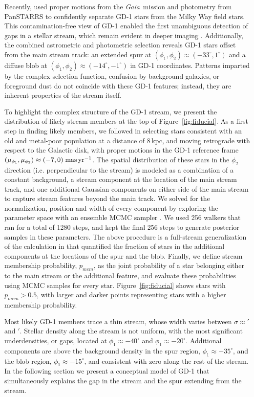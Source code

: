 \documentclass[twocolumn]{aastex62}
\newcommand{\gaia}{\textsl{Gaia}}
\begin{document}
Recently, \citet{pwb} used proper motions from the \gaia\ mission \citep{gdr2} and photometry from PanSTARRS \citep{ps} to confidently separate GD-1 stars from the Milky Way field stars.
This contamination-free view of GD-1 enabled the first unambiguous detection of gaps in a stellar stream, which remain evident in deeper imaging \citep{deboer2018}.
Additionally, the combined astrometric and photometric selection reveals GD-1 stars offset from the main stream track: an extended spur at $(\phi_1, \phi_2)\approx(-33^\circ,1^\circ)$ and a diffuse blob at $(\phi_1, \phi_2)\approx(-14^\circ,-1^\circ)$ in GD-1 coordinates.
Patterns imparted by the complex selection function, confusion by background galaxies, or foreground dust do not coincide with these GD-1 features; instead, they are inherent properties of the stream itself.

To highlight the complex structure of the GD-1 stream, we present the distribution of likely stream members at the top of Figure~\ref{fig:fiducial}.
As a first step in finding likely members, we followed \citet{pwb} in selecting stars consistent with an old and metal-poor population at a distance of 8\,kpc, and moving retrograde with respect to the Galactic disk, with proper motions in the GD-1 reference frame $(\mu_{\phi_1}, \mu_{\phi_2})\approx(-7,0)\;\rm mas\,yr^{-1}$.
The spatial distribution of these stars in the $\phi_2$ direction (i.e. perpendicular to the stream) is modeled as a combination of a constant background, a stream component at the location of the main stream track, and one additional Gaussian components on either side of the main stream to capture stream features beyond the main track.
We solved for the normalization, position and width of every component by exploring the parameter space with an ensemble MCMC sampler \citep{Foreman-Mackey:2013}.
We used 256 walkers that ran for a total of 1280 steps, and kept the final 256 steps to generate posterior samples in these parameters.
The above procedure is a full-stream generalization of the calculation in \citep{pwb} that quantified the fraction of stars in the additional components at the locations of the spur and the blob.
Finally, we define stream membership probability, $p_{mem}$, as the joint probability of a star belonging either to the main stream or the additional feature, and evaluate these probabilities using MCMC samples for every star.
Figure~\ref{fig:fiducial} shows stars with $p_{mem}>0.5$, with larger and darker points representing stars with a higher membership probability.

Most likely GD-1 members trace a thin stream, whose width varies between $\sigma\approx'$ and $'$.
Stellar density along the stream is not uniform, with the most significant underdensities, or gaps, located at $\phi_1\approx-40^\circ$ and $\phi_1\approx-20^\circ$.
Additional components are above the background density in the spur region, $\phi_1\approx-35^\circ$, and the blob region, $\phi_1\approx-15^\circ$, and consistent with zero along the rest of the stream.
In the following section we present a conceptual model of GD-1 that simultaneously explains the gap in the stream and the spur extending from the stream.
\end{document}
